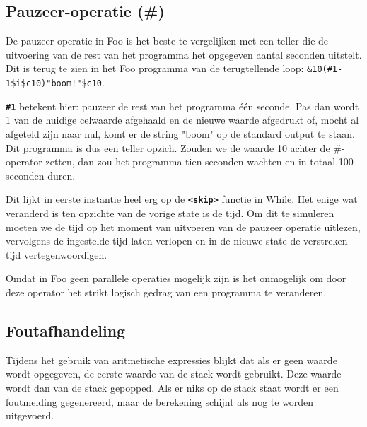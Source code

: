 \documentclass[11pt]{article}
\begin{document}
\subsection{Pauzeer-operatie (\#)}
De pauzeer-operatie in Foo is het beste te vergelijken met een teller die de uitvoering van de rest van het programma het opgegeven aantal seconden uitstelt. 
Dit is terug te zien in het Foo programma van de terugtellende loop: \verb|&10(#1-1$i$c10)"boom!"$c10|.

{\bf \verb|#1|} betekent hier: pauzeer de rest van het programma \'e\'en seconde. 
Pas dan wordt 1 van de huidige celwaarde afgehaald en de nieuwe waarde afgedrukt of, mocht al afgeteld zijn naar nul, komt er de string "boom" op de standard output te staan.
Dit programma is dus een teller opzich.
Zouden we de waarde 10 achter de \#-operator zetten, dan zou het programma tien seconden wachten en in totaal 100 seconden duren.


Dit lijkt in eerste instantie heel erg op de {\bf\verb|<skip>|} functie in While.
Het enige wat veranderd is ten opzichte van de vorige state is de tijd.
Om dit te simuleren moeten we de tijd op het moment van uitvoeren van de pauzeer operatie uitlezen, vervolgens de ingestelde tijd laten verlopen en in de nieuwe state de verstreken tijd vertegenwoordigen.

Omdat in Foo geen parallele operaties mogelijk zijn is het onmogelijk om door deze operator het strikt logisch gedrag van een programma te veranderen.

\subsection{Foutafhandeling} %

Tijdens het gebruik van aritmetische expressies blijkt dat als er geen waarde wordt opgegeven, de eerste waarde van de stack wordt gebruikt. 
Deze waarde wordt dan van de stack gepopped. 
Als er niks op de stack staat wordt er een foutmelding gegenereerd, maar de berekening schijnt als nog te worden uitgevoerd.
\end{document}
